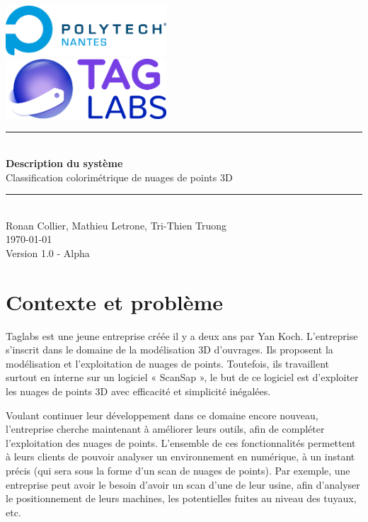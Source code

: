 \documentclass[12pt,titlepage,french]{article}
\begin{document}
\begin{titlepage}
\newcommand{\HRule}{\rule{\linewidth}{0.5mm}}
\center

  \includegraphics[width=0.45\textwidth]{../ressources/img_logos/logo_polytech.png}\\[1cm]
   
  \includegraphics[width=0.45\textwidth]{../ressources/img_logos/logo_taglabs.png}


\HRule \\[0.4cm]
{ \huge \bfseries Description du système \\[0.15cm] }
Classification colorimétrique de nuages de points 3D
\HRule \\[1.5cm]
Ronan Collier,
Mathieu Letrone,
Tri-Thien Truong
\\[1cm]
\today \\ [1cm]
Version 1.0 - Alpha
\end{titlepage}

\tableofcontents %
\newpage
\listoffigures  %
\newpage
\section{Contexte et problème}

Taglabs est une jeune entreprise créée il y a deux ans par Yan Koch. L’entreprise s’inscrit dans le domaine de la modélisation 3D d’ouvrages. Ils proposent la modélisation et l’exploitation de nuages de points. Toutefois, ils travaillent surtout en interne sur un logiciel « ScanSap », le but de ce logiciel est d’exploiter les nuages de points 3D avec efficacité et simplicité inégalées.

Voulant continuer leur développement dans ce domaine encore nouveau, l'entreprise cherche maintenant à améliorer leurs outils, afin de compléter l'exploitation des nuages de points. L'ensemble de ces fonctionnalités permettent à leurs clients de pouvoir analyser un environnement en numérique, à un instant précis (qui sera sous la forme d'un scan de nuages de points). Par exemple, une entreprise peut avoir le besoin d'avoir un scan d'une de leur usine, afin d'analyser le positionnement de leurs machines, les potentielles fuites au niveau des tuyaux, etc.
\end{document}
